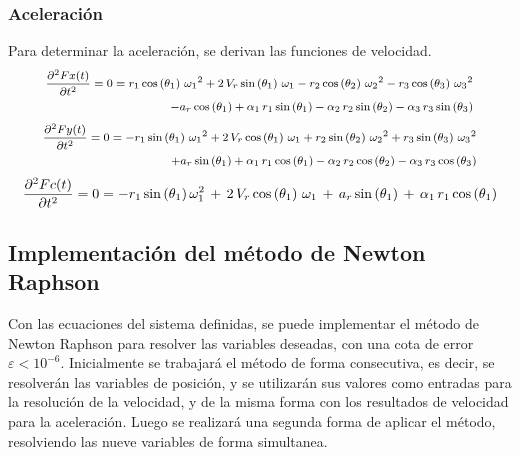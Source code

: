 \documentclass[12pt]{article}
\begin{document}
\subsubsection{Aceleración}
Para determinar la aceleración, se derivan las funciones de velocidad.
\begin{equation}
\footnotesize
    \begin{split}
    \frac{\partial^2 Fx(t)}{\partial t^2}=0=r_1 \,\mathrm{cos}\left(\theta_1 \right)\,{\omega_1 }^2 +2\,V_r \,\mathrm{sin}\left(\theta_1 \right)\,\omega_1 -r_2 \,\mathrm{cos}\left(\theta_2 \right)\,{\omega_2 }^2 -r_3 \,\mathrm{cos}\left(\theta_3 \right)\,{\omega_3 }^2\\
        -a_r \,\mathrm{cos}\left(\theta_1 \right)+\alpha_1 \,r_1 \,\mathrm{sin}\left(\theta_1 \right)-\alpha_2 \,r_2 \,\mathrm{sin}\left(\theta_2 \right)-\alpha_3 \,r_3 \,\mathrm{sin}\left(\theta_3 \right)
    \end{split}    \label{ac x}
\end{equation}
\begin{equation}
\footnotesize
    \begin{split}
       \frac{\partial^2 Fy(t)}{\partial t^2}=0=-r_1 \,\mathrm{sin}\left(\theta_1 \right)\,{\omega_1 }^2 +2\,V_r \,\mathrm{cos}\left(\theta_1 \right)\,\omega_1 +r_2 \,\mathrm{sin}\left(\theta_2 \right)\,{\omega_2 }^2 +r_3 \,\mathrm{sin}\left(\theta_3 \right)\,{\omega_3 }^2\\
       +a_r \,\mathrm{sin}\left(\theta_1 \right)+\alpha_1 \,r_1 \,\mathrm{cos}\left(\theta_1 \right)-\alpha_2 \,r_2 \,\mathrm{cos}\left(\theta_2 \right)-\alpha_3 \,r_3 \,\mathrm{cos}\left(\theta_3 \right)
    \end{split}\label{ac y}
\end{equation}
\begin{equation}
\footnotesize
    \frac{\partial^2 Fc(t)}{\partial t^2}=0=-r_1\, \mathrm{sin}\left(\theta_1\right) \omega_1^2\, + \,2 \, V_r \, \mathrm{cos}\left(\theta_1\right)\, \omega_1\, +\,  a_r\, \mathrm{sin}\left(\theta_1\right)\,  +\, \alpha_1 \,  r_1\, \mathrm{cos}\left(\theta_1\right)
    \label{ac lig}
\end{equation}
\subsection{Implementación del método de Newton Raphson}
Con las ecuaciones del sistema definidas, se puede implementar el método de Newton Raphson para resolver las variables deseadas, con una cota de error $\varepsilon<10^{-6}$. Inicialmente se trabajará el método de forma consecutiva, es decir, se resolverán las variables de posición, y se utilizarán sus valores como entradas para la resolución de la velocidad, y de la misma forma con los resultados de velocidad para la aceleración. Luego se realizará una segunda forma de aplicar el método, resolviendo las nueve variables de forma simultanea.
\end{document}
